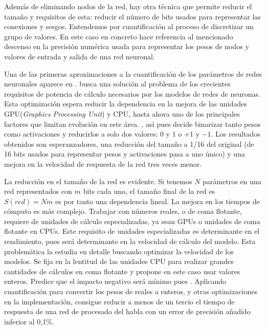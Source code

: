 Además de eliminando nodos de la red, hay otra técnica que permite reducir el tamaño y requisitos de esta: reducir el número de bits usados para representar las conexiones y sesgos. Entendemos por cuantificación al proceso de discretizar un grupo de valores. En este caso en concreto hace referencia al mencionado descenso en la precisión numérica usada para representar los pesos de nodos y valores de entrada y salida de una red neuronal.

Una de las primeras aproximaciones a la cuantificación de los parámetros de redes neuronales aparece en . \citeauthor{Courbariaux2015} busca una solución al problema de los crecientes requisitos de potencia de cálculo necesarios por los modelos de redes de neuronas. Esta optimización espera reducir la dependencia en la mejora de las unidades GPU(\textit{Graphics Processing Unit}) y CPU, hasta ahora uno de los principales factores que limitan evolución en este área. , así pues decide binarizar tanto pesos como activaciones y reducirlos a solo dos valores: $0$ y $1$ o $+1$ y $-1$. Los resultados obtenidos son esperanzadores, una reducción del tamaño a 1/16 del original (de 16 bits usados para representar pesos y activaciones pasa a uno único) y una mejora en la velocidad de respuesta de la red tres veces menor.

La reducción en el tamaño de la red es evidente. Si tenemos $N$ parámetros en una red representados con $m$ bits cada uno, el tamaño final de la red es $S(red)=Nm$ es por tanto una dependencia lineal. La mejora en los tiempos de cómputo es más complejo. Trabajar con números reales, o de coma flotante, requiere de unidades de cálculo especializadas, ya sean GPUs o unidades de coma flotante en CPUs. Este requisito de unidades especializadas es determinante en el rendimiento, pues será determinante en la velocidad de cálculo del modelo. Esta problemática la estudia en detalle  buscando optimizar la velocidad de los modelos. Se fija en la lentitud de las unidades CPU para realizar grandes cantidades de cálculos en coma flotante y propone en este caso usar valores enteros. Predice que el impacto negativo será mínimo pues . Aplicando cuantificación para convertir los pesos de reales a enteros, y otras optimizaciones en la implementación, consigue reducir a menos de un tercio el tiempo de respuesta de una red de procesado del habla con un error de precisión añadido inferior al 0,1\%.

